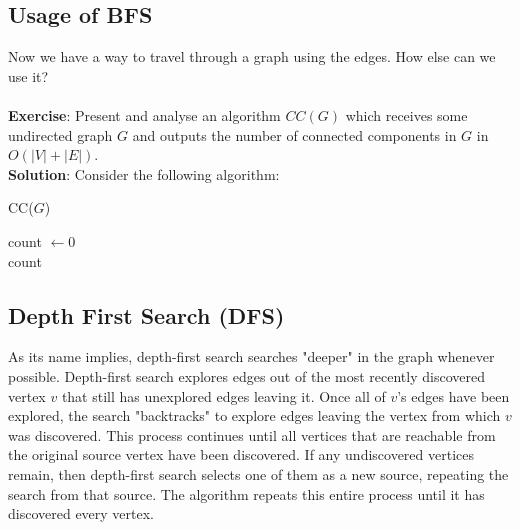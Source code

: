 \subsection{Usage of BFS}
Now we have a way to travel through a graph using the edges. How else can we use it?\\ \\ 
\textbf{Exercise}: Present and analyse an algorithm $CC(G)$ which receives some undirected graph $G$ and outputs the number of connected components in $G$ in $O(|V|+|E|)$. \\

\textbf{Solution}: Consider the following algorithm: 

  \begin{algorithm}
  \caption{CC($G$)}
     count $\leftarrow 0$\\
	\Return count
  \end{algorithm}

  \ifdefined\DFS

\subsection{Depth First Search (DFS)}
As its name implies, depth-first search searches "deeper" in the graph whenever possible. Depth-first search explores edges out of the most recently discovered vertex $v$ that still has unexplored edges leaving it. Once all of $ v$'s edges have been explored, the search "backtracks" to explore edges leaving the vertex from which $v$ was discovered. This process continues until all vertices that are reachable from the original source vertex have been discovered. If any undiscovered vertices remain, then depth-first search selects one of them as a new source, repeating the search from that source. The algorithm repeats this entire process until it has discovered every vertex.

